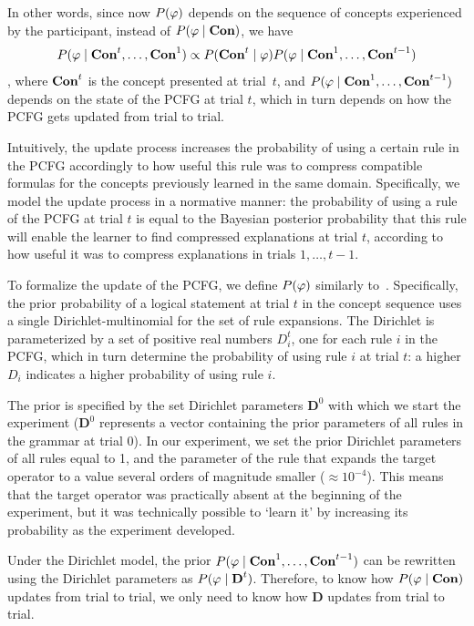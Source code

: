 In other words, since now $P(\varphi)$ depends on the sequence of concepts experienced by the participant, instead of $P(\varphi\mid \textbf{Con})$, we have $$P(\varphi\mid \textbf{Con}^{t},\dots,\textbf{Con}^{1}) \propto P(\textbf{Con}^{t}\mid \varphi)P(\varphi\mid \textbf{Con}^{1},\dots,\textbf{Con}^{t-1})$$, 
%
where $\textbf{Con}^{t}$ is the concept presented at trial~$t$, and $P(\varphi\mid \textbf{Con}^{1},\dots,\textbf{Con}^{t-1})$ depends on the state of the PCFG at trial $t$, which in turn depends on how the PCFG gets updated from trial to trial.

Intuitively, the update process increases the probability of using a certain rule in the PCFG accordingly to how useful this rule was to compress compatible formulas for the concepts previously learned in the same domain. Specifically, we model the update process in a normative manner: the probability of using a rule of the PCFG at trial $t$ is equal to the Bayesian posterior probability that this rule will enable the learner to find compressed explanations at trial $t$, according to how useful it was to compress explanations in trials $1,\dots,t-1$.

To formalize the update of the PCFG, we define $P(\varphi)$ similarly to~\cite{goodman2008rational}. Specifically, the prior probability of a logical statement at trial $t$ in the concept sequence uses a single Dirichlet-multinomial for the set of rule expansions. The Dirichlet is parameterized by a set of positive real numbers $D_{i}^{t}$, one for each rule $i$ in the PCFG, which in turn determine the probability of using rule $i$ at trial $t$: a higher $D_{i}$ indicates a higher probability of using rule $i$.

The prior is specified by the set Dirichlet parameters $\textbf{D}^{0}$ with which we start the experiment ($\textbf{D}^{0}$ represents a vector containing the prior parameters of all rules in the grammar at trial 0). In our experiment, we set the prior Dirichlet parameters of all rules equal to 1, and the parameter of the rule that expands the target operator to a value several orders of magnitude smaller ($\approx 10^{-4}$). This means that the target operator was practically absent at the beginning of the experiment, but it was technically possible to `learn it' by increasing its probability as the experiment developed.

Under the Dirichlet model, the prior $P(\varphi\mid \textbf{Con}^{1},\dots,\textbf{Con}^{t-1})$ can be rewritten using the Dirichlet parameters as $P(\varphi\mid\textbf{D}^{t})$. Therefore, to know how $P(\varphi\mid \textbf{Con})$ updates from trial to trial, we only need to know how $\textbf{D}$ updates from trial to trial.

